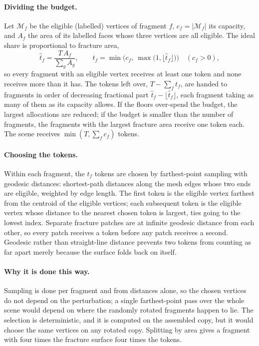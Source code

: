 \documentclass[11pt,a4paper]{article}
\theoremstyle{remark}
\begin{document}
\paragraph{Dividing the budget.} Let $\mathcal M_f$ be the eligible (labelled) vertices of fragment $f$, $c_f=|\mathcal M_f|$ its capacity, and $A_f$ the area of its labelled faces whose three vertices are all eligible. The ideal share is proportional to fracture area,
\begin{equation}
  \hat t_f=\frac{T\,A_f}{\sum_g A_g},\qquad
  t_f=\min\!\Big(c_f,\ \max\big(1,\lfloor\hat t_f\rfloor\big)\Big)\quad(c_f>0),
\end{equation}
so every fragment with an eligible vertex receives at least one token and none receives more than it has. The tokens left over, $T-\sum_f t_f$, are handed to fragments in order of decreasing fractional part $\hat t_f-\lfloor\hat t_f\rfloor$, each fragment taking as many of them as its capacity allows. If the floors over-spend the budget, the largest allocations are reduced; if the budget is smaller than the number of fragments, the fragments with the largest fracture area receive one token each. The scene receives $\min(T,\sum_fc_f)$ tokens.

\paragraph{Choosing the tokens.} Within each fragment, the $t_f$ tokens are chosen by farthest-point sampling with geodesic distances: shortest-path distances along the mesh edges whose two ends are eligible, weighted by edge length. The first token is the eligible vertex farthest from the centroid of the eligible vertices; each subsequent token is the eligible vertex whose distance to the nearest chosen token is largest, ties going to the lowest index. Separate fracture patches are at infinite geodesic distance from each other, so every patch receives a token before any patch receives a second. Geodesic rather than straight-line distance prevents two tokens from counting as far apart merely because the surface folds back on itself.

\paragraph{Why it is done this way.} Sampling is done per fragment and from distances alone, so the chosen vertices do not depend on the perturbation; a single farthest-point pass over the whole scene would depend on where the randomly rotated fragments happen to lie. The selection is deterministic, and it is computed on the assembled copy, but it would choose the same vertices on any rotated copy. Splitting by area gives a fragment with four times the fracture surface four times the tokens.
\end{document}
